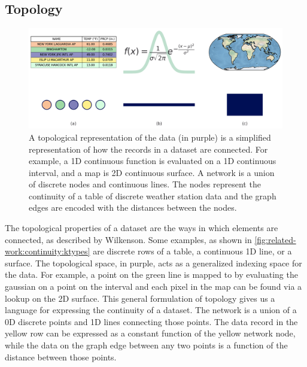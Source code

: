 \documentclass[10pt,journal,compsoc]{IEEEtran}
\theoremstyle{definition}
\theoremstyle{remark}
\begin{document}
\subsection{Topology}
\label{sec:related-work:continuity}
\begin{figure}[h!]
  \includegraphics[width=1\columnwidth]{k_different_types.png}
  \caption{A topological representation of the data (in purple) is a simplified representation of how the records in a dataset are connected. For example, a 1D continuous function is evaluated on a 1D continuous interval, and a map is 2D continuous surface. A network is a union of discrete nodes and continuous lines. The nodes represent the continuity of a table of discrete weather station data and the graph edges are encoded with the distances between the nodes. \label{fig:related-work:continuity:ktypes}}
\end{figure}
The topological properties of a dataset are the ways in which elements are connected, as described by Wilkenson\cite{wilkinsonGrammarGraphics2005}. Some examples, as shown in \autoref{fig:related-work:continuity:ktypes} are discrete rows of a table, a continuous 1D line, or a surface. The topological space, in purple, acts as a generalized indexing space for the data. For example, a point on the green line is mapped to by evaluating the gaussian on a point on the interval and each pixel in the map can be found via a lookup on the 2D surface. This general formulation of topology gives us a language for expressing the continuity of a dataset. The network is a union of a 0D discrete points and 1D lines connecting those points. The data record in the yellow row can be expressed as a constant function of the yellow network node, while the data on the graph edge between any two points is a function of the distance between those points. 
\end{document}
